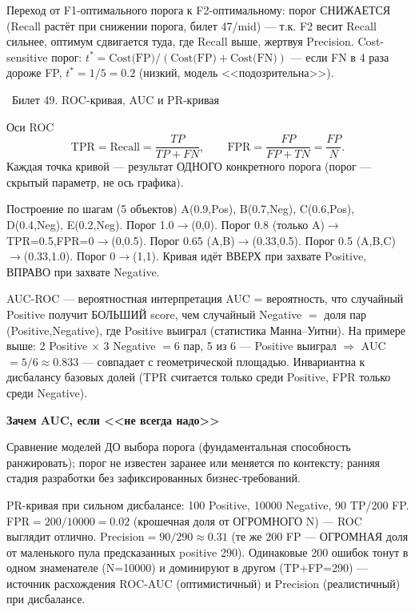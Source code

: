 \documentclass[12pt, a4paper]{article}
\newcommand{\bilet}[2]{%
  \vspace{10pt}%
  \noindent\colorbox{qcolor}{\parbox{\dimexpr\linewidth-2\fboxsep\relax}{%
    \color{white}\large\bfseries\strut\ Билет #1. #2%
  }}%
  \nopagebreak\vspace{5pt}\par\nopagebreak%
}
\newcommand{\qsub}[1]{%
  \vspace{5pt}%
  {\bfseries\color{defblue} #1}%
  \par\vspace{2pt}%
}
\begin{document}
\begin{fishkabox}
Переход от F1-оптимального порога к F2-оптимальному: порог СНИЖАЕТСЯ (Recall растёт при снижении порога, билет 47/mid) --- т.к. F2 весит Recall сильнее, оптимум сдвигается туда, где Recall выше, жертвуя Precision. Cost-sensitive порог: $t^*=\text{Cost(FP)}/(\text{Cost(FP)}+\text{Cost(FN)})$ --- если FN в 4 раза дороже FP, $t^*=1/5=0.2$ (низкий, модель <<подозрительна>>).
\end{fishkabox}

\bilet{49}{ROC-кривая, AUC и PR-кривая}

\begin{defbox}{Оси ROC}
\[
  \text{TPR}=\text{Recall}=\frac{TP}{TP+FN}, \qquad \text{FPR}=\frac{FP}{FP+TN}=\frac{FP}{N}.
\]
Каждая точка кривой --- результат ОДНОГО конкретного порога (порог --- скрытый параметр, не ось графика).
\end{defbox}

\begin{exbox}{Построение по шагам (5 объектов)}
A(0.9,Pos), B(0.7,Neg), C(0.6,Pos), D(0.4,Neg), E(0.2,Neg). Порог 1.0$\to$(0,0). Порог 0.8 (только A)$\to$TPR=0.5,FPR=0$\to$(0,0.5). Порог 0.65 (A,B)$\to$(0.33,0.5). Порог 0.5 (A,B,C)$\to$(0.33,1.0). Порог 0$\to$(1,1). Кривая идёт ВВЕРХ при захвате Positive, ВПРАВО при захвате Negative.
\end{exbox}

\begin{thmbox}{AUC-ROC --- вероятностная интерпретация}
AUC = вероятность, что случайный Positive получит БОЛЬШИЙ score, чем случайный Negative $=$ доля пар (Positive,Negative), где Positive выиграл (статистика Манна--Уитни). На примере выше: 2 Positive $\times$ 3 Negative $=6$ пар, 5 из 6 --- Positive выиграл $\Rightarrow$ AUC$=5/6\approx0.833$ --- совпадает с геометрической площадью.
Инвариантна к дисбалансу базовых долей (TPR считается только среди Positive, FPR только среди Negative).
\end{thmbox}

\qsub{Зачем AUC, если <<не всегда надо>>}
Сравнение моделей ДО выбора порога (фундаментальная способность ранжировать); порог не известен заранее или меняется по контексту; ранняя стадия разработки без зафиксированных бизнес-требований.

\begin{fishkabox}
PR-кривая при сильном дисбалансе: 100 Positive, 10000 Negative, 90 TP/200 FP. FPR$=200/10000=0.02$ (крошечная доля от ОГРОМНОГО N) --- ROC выглядит отлично. Precision$=90/290\approx0.31$ (те же 200 FP --- ОГРОМНАЯ доля от маленького пула предсказанных positive 290). Одинаковые 200 ошибок тонут в одном знаменателе (N=10000) и доминируют в другом (TP+FP=290) --- источник расхождения ROC-AUC (оптимистичный) и Precision (реалистичный) при дисбалансе.
\end{fishkabox}
\end{document}

